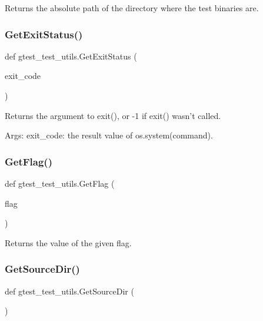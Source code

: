 \begin{DoxyVerb}Returns the absolute path of the directory where the test binaries are.\end{DoxyVerb}
 \mbox{\label{namespacegtest__test__utils_acf8280de4dc027a28ffc9de43f245b50}} 
\subsubsection{\texorpdfstring{GetExitStatus()}{GetExitStatus()}}
{\footnotesize\ttfamily def gtest\+\_\+test\+\_\+utils.\+Get\+Exit\+Status (\begin{DoxyParamCaption}\item[{}]{exit\+\_\+code }\end{DoxyParamCaption})}

\begin{DoxyVerb}Returns the argument to exit(), or -1 if exit() wasn't called.

Args:
  exit_code: the result value of os.system(command).
\end{DoxyVerb}
 \mbox{\label{namespacegtest__test__utils_a052da74a5e39162480daf3a4d8eff9a6}} 
\subsubsection{\texorpdfstring{GetFlag()}{GetFlag()}}
{\footnotesize\ttfamily def gtest\+\_\+test\+\_\+utils.\+Get\+Flag (\begin{DoxyParamCaption}\item[{}]{flag }\end{DoxyParamCaption})}

\begin{DoxyVerb}Returns the value of the given flag.\end{DoxyVerb}
 \mbox{\label{namespacegtest__test__utils_aaff66cb0980804d8bd57dc719d4b5518}} 
\subsubsection{\texorpdfstring{GetSourceDir()}{GetSourceDir()}}
{\footnotesize\ttfamily def gtest\+\_\+test\+\_\+utils.\+Get\+Source\+Dir (\begin{DoxyParamCaption}{ }\end{DoxyParamCaption})}

